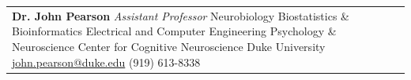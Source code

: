 \documentclass[margin]{res}
\begin{document}
\begin{resume}
\begin{tabular}{p{6cm} p{5.5cm}}
    \vspace{\baselineskip}
    \textbf{Dr. John Pearson}\newline
    \small{
      \emph{Assistant Professor}\newline
      Neurobiology\newline
      Biostatistics \& Bioinformatics\newline
      Electrical and Computer Engineering\newline
      Psychology \& Neuroscience\newline
      Center for Cognitive Neuroscience\newline
      Duke University\newline
      \href{mailto:john.pearson@duke.edu}{john.pearson@duke.edu}\newline
      (919) 613-8338}
  \end{tabular}
\end{resume}
\end{document}
